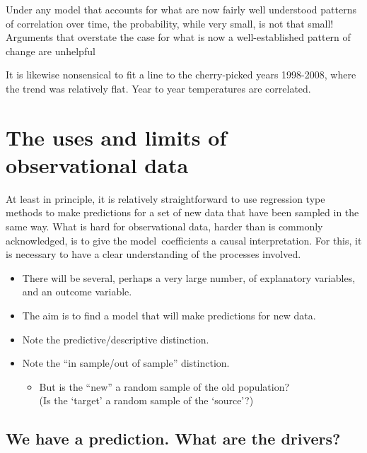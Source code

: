 \documentclass[
  10pt,
  b5paper]{book}
\providecommand{\tightlist}{%
  \setlength{\itemsep}{0pt}\setlength{\parskip}{0pt}}
\begin{document}
Under any model that accounts for what are now
fairly well understood patterns of correlation over time,
the probability, while very small, is not that small!
Arguments that overstate the case for what is now a
well-established pattern of change are unhelpful

It is likewise nonsensical to fit a line to the cherry-picked
years 1998-2008, where the trend was relatively flat. Year
to year temperatures are correlated.

\hypertarget{the-uses-and-limits-of-observational-data}{%
\chapter{The uses and limits of observational data}\label{the-uses-and-limits-of-observational-data}}

At least in principle, it is relatively straightforward to use
regression type methods to make predictions for a set of new
data that have been sampled in the same way. What is hard for
observational data, harder than is commonly acknowledged,
is to give the model~coefficients a causal interpretation.
For this, it is necessary to have a clear understanding of the
processes involved.

\begin{itemize}
\tightlist
\item
  There will be several, perhaps a very large number,
  of explanatory variables, and an outcome variable.
\item
  The aim is to find a model that will make predictions for new data.
\item
  Note the predictive/descriptive distinction.\\
\item
  Note the ``in sample/out of sample'' distinction.

  \begin{itemize}
  \tightlist
  \item
    But is the ``new'' a random sample of the old population?\\
    (Is the `target' a random sample of the `source'?)
  \end{itemize}
\end{itemize}

\hypertarget{we-have-a-prediction.-what-are-the-drivers}{%
\section{We have a prediction. What are the drivers?}\label{we-have-a-prediction.-what-are-the-drivers}}
\end{document}
